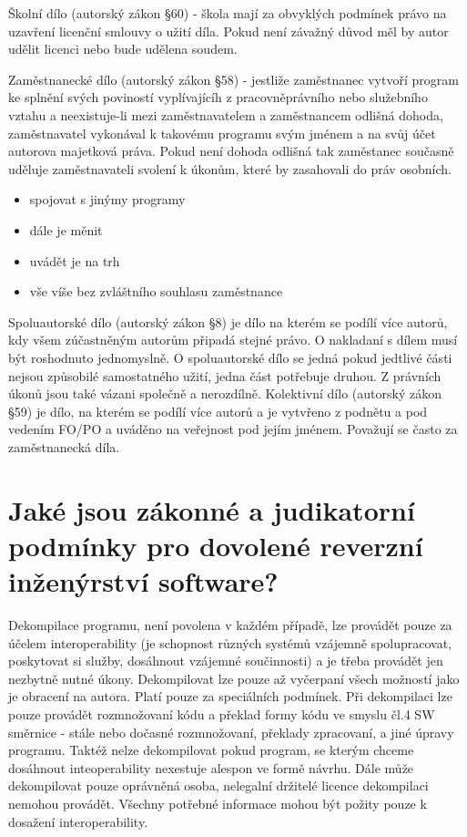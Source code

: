 \documentclass[12pt,a4paper,czech]{article}
\newcommand{\nadpis}[1]{{\section{#1}}}
\begin{document}
Školní dílo (autorský zákon §60) - škola mají za obvyklých podmínek právo na uzavření licenční smlouvy o užití díla. Pokud není závažný důvod měl by autor udělit licenci nebo bude udělena soudem.

Zaměstnanecké dílo (autorský zákon §58) - jestliže zaměstnanec vytvoří program ke splnění svých poviností vyplívajícíh z pracovněprávního nebo služebního vztahu a neexistuje-li mezi zaměstnavatelem a zaměstnancem odlišná dohoda, zaměstnavatel vykonával k takovému programu svým jménem a na svůj účet autorova majetková práva. Pokud není dohoda odlišná tak zaměstanec současně uděluje zaměstnavateli svolení k úkonům, které by zasahovali do práv osobních.
\begin{itemize}
    \setlength\itemsep{0em}
    \item spojovat s jinýmy programy
    \item dále je měnit 
    \item uvádět je na trh
    \item vše víše bez zvláštního souhlasu zaměstnance
\end{itemize}

Spoluautorské dílo (autorský zákon §8) je dílo na kterém se podílí více autorů, kdy všem zúčastněným autorům připadá stejné právo. O nakladaní s dílem musí být roshodnuto jednomyslně. O spoluautorské dílo se jedná pokud jedtlivé části nejsou způsobilé samostatného užití, jedna část potřebuje druhou. Z právních úkonů jsou také vázani společně a nerozdílně.
Kolektivní dílo (autorský zákon §59) je dílo, na kterém se podílí více autorů a je vytvřeno z podnětu a pod vedením FO/PO a uváděno na veřejnost pod jejím jménem. Považují se často za zaměstnanecká díla.

\vspace{0.5cm} 
\nadpis{Jaké jsou zákonné a judikatorní podmínky pro dovolené reverzní inženýrství software?}

Dekompilace programu, není povolena v každém případě, lze provádět pouze za účelem interoperability (je schopnost různých systémů vzájemně spolupracovat, poskytovat si služby, dosáhnout vzájemné součinnosti) a je třeba provádět jen nezbytně nutné úkony. Dekompilovat lze pouze až vyčerpaní všech možností jako je obracení na autora. Platí pouze za speciálních podmínek. Při dekompilaci lze pouze provádět rozmnožovaní kódu a překlad formy kódu ve smyslu čl.4 SW směrnice - stále nebo dočasné rozmnožovaní, překlady zpracovaní, a jiné úpravy programu. Taktéž nelze dekompilovat pokud program, se kterým chceme dosáhnout inteoperability nexestuje alespon ve formě návrhu. Dále může dekompilovat pouze oprávněná osoba, nelegalní držitelé licence dekompilaci nemohou provádět. Všechny potřebné informace mohou být požity pouze k dosažení interoperability. 
\end{document}
